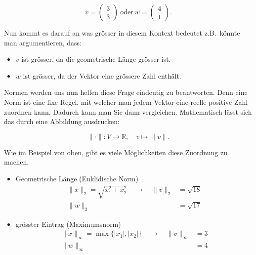 \begin{equation*}
    v = \begin{pmatrix} 3 \\ 3 \end{pmatrix} \ \text{oder} \ w = \begin{pmatrix} 4 \\ 1 \end{pmatrix}.
\end{equation*}

\vspace{0.25\baselineskip}

Nun kommt es darauf an was grösser in diesem Kontext bedeutet z.B.\ könnte man argumentieren, dass:

\begin{itemize}
    \item \( v \) ist grösser, da die geometrische Länge grösser ist.
    \item \( w \) ist grösser, da der Vektor eine grössere Zahl enthält.
\end{itemize}

Normen werden uns nun helfen diese Frage eindeutig zu beantworten. Denn eine Norm ist eine fixe Regel, mit welcher man jedem Vektor eine reelle positive Zahl zuordnen kann. Dadurch kann man Sie dann vergleichen. Mathematisch lässt sich das durch eine Abbildung ausdrücken:

\begin{equation*}
    \| {\cdot} \| : V \rightarrow \mathbb{R}, \quad v \mapsto \| v \|.
\end{equation*}

\vspace{0.25\baselineskip}

Wie im Beispiel von oben, gibt es viele Möglichkeiten diese Zuordnung zu machen. 

\begin{itemize}
    \item Geometrische Länge (Euklidische Norm)
        \begin{equation*}
            \begin{aligned}
                \| x \|_2 = \sqrt{x_1^2 + x_2^2} \quad \to \quad \| v \|_2 &= \sqrt{18} \\
                \| w \|_2 &= \sqrt{17}
            \end{aligned}        
        \end{equation*}
    \item grösster Eintrag (Maximumsnorm)
        \begin{equation*}
            \begin{aligned}
                \| x \|_\infty = \max \{ |x_1|, |x_2| \} \quad \to \quad \| v \|_\infty &= 3 \\
                \| w \|_\infty &= 4
            \end{aligned}        
        \end{equation*}
\end{itemize}

